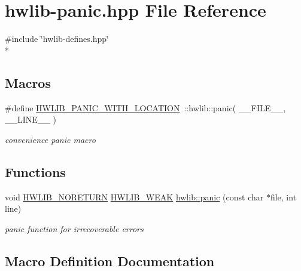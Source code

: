 \hypertarget{hwlib-panic_8hpp}{}\section{hwlib-\/panic.hpp File Reference}
\label{hwlib-panic_8hpp}
{\ttfamily \#include \char`\"{}hwlib-\/defines.\+hpp\char`\"{}}\\*
\subsection*{Macros}
\begin{DoxyCompactItemize}
\item 
\#define \hyperlink{hwlib-panic_8hpp_a63e41f8f1231b208819549fe26a58440}{H\+W\+L\+I\+B\+\_\+\+P\+A\+N\+I\+C\+\_\+\+W\+I\+T\+H\+\_\+\+L\+O\+C\+A\+T\+I\+ON}~\+::hwlib\+::panic( \+\_\+\+\_\+\+F\+I\+L\+E\+\_\+\+\_\+, \+\_\+\+\_\+\+L\+I\+N\+E\+\_\+\+\_\+ )
\begin{DoxyCompactList}\small\item\em convenience panic macro \end{DoxyCompactList}\end{DoxyCompactItemize}
\subsection*{Functions}
\begin{DoxyCompactItemize}
\item 
void \hyperlink{hwlib-defines_8hpp_aef311f1f416fdcbd1fa22376dcc01029}{H\+W\+L\+I\+B\+\_\+\+N\+O\+R\+E\+T\+U\+RN} \hyperlink{hwlib-defines_8hpp_a04be4340016df60d6636c1d1c6d94fc9}{H\+W\+L\+I\+B\+\_\+\+W\+E\+AK} \hyperlink{hwlib-panic_8hpp_adc07d80c1eeeabf8c96b6acbd5dce78f}{hwlib\+::panic} (const char $\ast$file, int line)
\begin{DoxyCompactList}\small\item\em panic function for irrecoverable errors \end{DoxyCompactList}\end{DoxyCompactItemize}


\subsection{Macro Definition Documentation}
